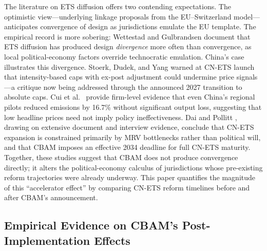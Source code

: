 \documentclass[letterpaper, 10pt, conference]{ieeeconf}
\begin{document}
The literature on ETS diffusion offers two contending expectations. The optimistic view---underlying linkage proposals from the EU--Switzerland model---anticipates convergence of design as jurisdictions emulate the EU template. The empirical record is more sobering: Wettestad and Gulbrandsen \citeyearpar{Wettestad2018} document that ETS diffusion has produced design \textit{divergence} more often than convergence, as local political-economy factors override technocratic emulation. China's case illustrates this divergence. Stoerk, Dudek, and Yang \citeyearpar{Stoerk2019} warned at CN-ETS launch that intensity-based caps with ex-post adjustment could undermine price signals---a critique now being addressed through the announced 2027 transition to absolute caps. Cui et al.\ \citeyearpar{Cui2021} provide firm-level evidence that even China's regional pilots reduced emissions by 16.7\% without significant output loss, suggesting that low headline prices need not imply policy ineffectiveness. Dai and Pollitt \citeyearpar{Dai2025}, drawing on extensive document and interview evidence, conclude that CN-ETS expansion is constrained primarily by MRV bottlenecks rather than political will, and that CBAM imposes an effective 2034 deadline for full CN-ETS maturity. Together, these studies suggest that CBAM does not produce convergence directly; it alters the political-economy calculus of jurisdictions whose pre-existing reform trajectories were already underway. This paper quantifies the magnitude of this ``accelerator effect'' by comparing CN-ETS reform timelines before and after CBAM's announcement.

\subsection{Empirical Evidence on CBAM's Post-Implementation Effects}
\label{sec:lit-empirical}
\end{document}

